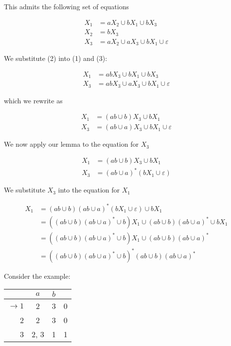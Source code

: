 This admits the following set of equations 

\begin{align}
      X_1 &= aX_2\cup bX_1\cup bX_3\\
      X_2 &= bX_3\\
      X_3 &= aX_2\cup aX_3\cup bX_1\cup\varepsilon
\end{align}

We substitute (2) into (1) and (3):

\begin{align*}
      X_1 &= abX_3\cup bX_1\cup bX_3\\
      X_3 &= abX_3\cup aX_3\cup bX_1\cup\varepsilon
\end{align*}

which we rewrite as

\begin{align*}
      X_1 &= (ab\cup b)X_3\cup bX_1\\
      X_3 &= (ab\cup a)X_3\cup bX_1\cup\varepsilon
\end{align*}

We now apply our lemma to the equation for $X_3$

\begin{align*}
      X_1 &= (ab\cup b)X_3\cup bX_1\\
      X_3 &= (ab\cup a)^*(bX_1\cup\varepsilon)
\end{align*}

We substitute $X_3$ into the equation for $X_1$

\begin{align*}
      X_1&=(ab\cup b)(ab\cup a)^*(bX_1\cup\varepsilon)\cup bX_1\\
         &=\left((ab\cup b)(ab\cup a)^*\cup b\right)X_1\cup (ab\cup b)(ab\cup a)^*\cup bX_1\\
         &=\left((ab\cup b)(ab\cup a)^*\cup b\right)X_1\cup (ab\cup b)(ab\cup a)^*\\
         &=\left((ab\cup b)(ab\cup a)^*\cup b\right)^*(ab\cup b)(ab\cup a)^*
\end{align*}

Consider the example:

\begin{center}\begin{tabular}{r| c c r}
      & $a$ & $b$ & \\\hline
      $\to 1$ & 2 & 3 & 0\\
            2 & 2 & 3 & 0\\
            3 & 2, 3 & 1 & 1
 \end{tabular}\end{center}

